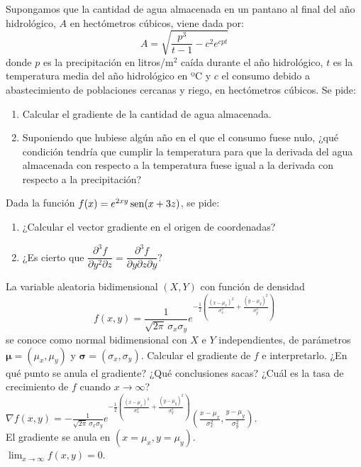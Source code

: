 {Supongamos que la cantidad de agua almacenada en un pantano al final del año hidrológico, $A$ en hectómetros cúbicos, viene dada por:
\[
A = \sqrt {\frac{{p^3 }}{{t - 1}} - c^2 e^{cpt}}
\]
donde $p$ es la precipitación en litros/m$^2$ caí­da durante el año hidrológico, $t$ es la temperatura media del año hidrológico en ºC y $c$ el consumo debido a abastecimiento de poblaciones cercanas y riego, en hectómetros cúbicos.
Se pide:
\begin{enumerate}
\item Calcular el gradiente de la cantidad de agua almacenada.
\item Suponiendo que hubiese algún año en el que el consumo fuese nulo, ¿qué condición tendría­ que cumplir la temperatura para que la derivada del agua almacenada con respecto a la temperatura fuese igual a la derivada con respecto a la precipitación?
\end{enumerate}
}


{Dada la función $f(x)=e^{2xy}\operatorname{sen}(x+3z)$, se pide:
\begin{enumerate}
  \item ¿Calcular el vector gradiente en el origen de coordenadas?
  \item ¿Es cierto que $\dfrac{\partial^3f}{\partial y^2\partial z}=\dfrac{\partial^3f}{\partial y\partial z\partial y}?$
\end{enumerate}
}


{La variable aleatoria bidimensional $(X,Y)$ con función de densidad
\[
f(x,y) = \frac{1}{\sqrt{2\pi}\, \sigma_x\sigma_y} e^{-\frac{1}{2}\left(\frac{(x-\mu_x)^2}{\sigma_x^2}+\frac{(y-\mu_y)^2}{\sigma_y^2}\right)}
\]
se conoce como normal bidimensional con $X$ e $Y$ independientes, de parámetros $\mathbf{\mu}=(\mu_x,\mu_y)$ y $\mathbf{\sigma}=(\sigma_x,\sigma_y)$.
Calcular el gradiente de $f$ e interpretarlo. ¿En qué punto se anula el gradiente? ¿Qué conclusiones sacas? ¿Cuál es la tasa de crecimiento de $f$ cuando $x\rightarrow \infty$?
}
{$\nabla f(x,y) = -\frac{1}{\sqrt{2\pi}\, \sigma_x\sigma_y} e^{-\frac{1}{2}\left(\frac{(x-\mu_x)^2}{\sigma_x^2}+\frac{(y-\mu_y)^2}{\sigma_y^2}\right)} \left(\frac{x-\mu_x}{\sigma_x^2}, \frac{y-\mu_y}{\sigma_y^2}\right)$.\\
El gradiente se anula en $(x=\mu_x, y=\mu_y)$.\\
$\lim_{x\rightarrow \infty}f(x,y) = 0$.
}
{
}



